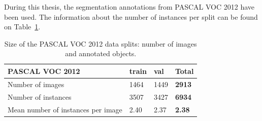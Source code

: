 During this thesis, the segmentation annotations from PASCAL VOC 2012 have been used. The information about the number of instances per split can be found on Table~\ref{table:pascal}.

\begin{table}[h]
\centering
\begin{tabular}{l|lll}
PASCAL VOC 2012                    & train & val  & \textbf{Total} \\
\hline
Number of images                & 1464    & 1449   & \textbf{2913}    \\
Number of instances           & 3507 & 3427 & \textbf{6934} \\
Mean number of instances per image & 2.40  & 2.37 & \textbf{2.38}  \\
\end{tabular}
\caption{Size of the PASCAL VOC 2012 data splits: number of images and annotated objects.}
\label{table:pascal}
\end{table}
